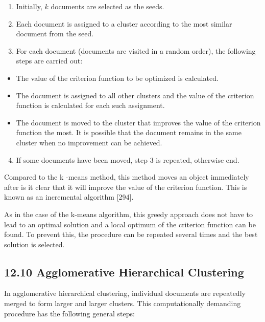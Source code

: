 \documentclass[10pt]{book}
\begin{document}
\begin{enumerate}
  \item Initially, $k$ documents are selected as the seeds.
  \item Each document is assigned to a cluster according to the most similar document from the seed.
  \item For each document (documents are visited in a random order), the following steps are carried out:
\end{enumerate}

\begin{itemize}
  \item The value of the criterion function to be optimized is calculated.
  \item The document is assigned to all other clusters and the value of the criterion function is calculated for each such assignment.
  \item The document is moved to the cluster that improves the value of the criterion function the most. It is possible that the document remains in the same cluster when no improvement can be achieved.
\end{itemize}

\begin{enumerate}
  \setcounter{enumi}{3}
  \item If some documents have been moved, step 3 is repeated, otherwise end.
\end{enumerate}

Compared to the k -means method, this method moves an object immediately after is it clear that it will improve the value of the criterion function. This is known as an incremental algorithm [294].

As in the case of the k-means algorithm, this greedy approach does not have to lead to an optimal solution and a local optimum of the criterion function can be found. To prevent this, the procedure can be repeated several times and the best solution is selected.

\subsection*{12.10 Agglomerative Hierarchical Clustering}
In agglomerative hierarchical clustering, individual documents are repeatedly merged to form larger and larger clusters. This computationally demanding procedure has the following general steps:
\end{document}
